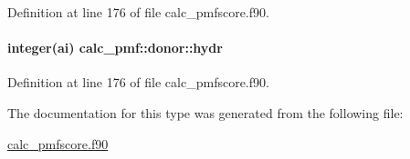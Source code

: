 Definition at line 176 of file calc\-\_\-pmfscore.\-f90.

\hypertarget{structcalc__pmf_1_1donor_aa574638324f14dc13d08c5494590a36e}{
\paragraph[{hydr}]{\setlength{\rightskip}{0pt plus 5cm}integer(ai) calc\-\_\-pmf\-::donor\-::hydr}}\label{structcalc__pmf_1_1donor_aa574638324f14dc13d08c5494590a36e}


Definition at line 176 of file calc\-\_\-pmfscore.\-f90.



The documentation for this type was generated from the following file\-:\begin{DoxyCompactItemize}
\item 
\hyperlink{calc__pmfscore_8f90}{calc\-\_\-pmfscore.\-f90}\end{DoxyCompactItemize}
